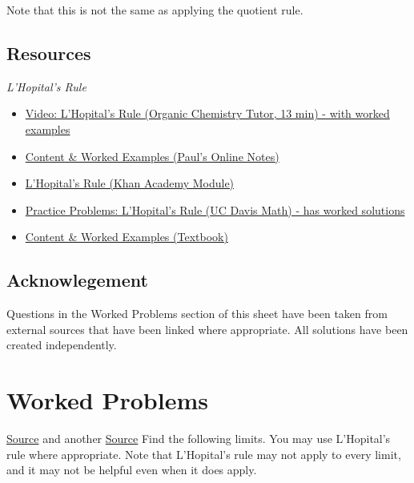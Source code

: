 \documentclass{article}
\begin{document}
\noindent Note that this is not the same as applying the quotient rule. 

\subsection*{Resources}


\noindent\textit{L'Hopital's Rule}
\begin{itemize}
    \item \href{https://youtu.be/Gh48aOvWcxw}{Video: L'Hopital's Rule (Organic Chemistry Tutor, 13 min) - with worked examples} 
    \item \href{https://tutorial.math.lamar.edu/classes/calci/lhospitalsrule.aspx}{Content \& Worked Examples (Paul's Online Notes)}
    \item \href{https://www.khanacademy.org/math/ap-calculus-ab/ab-diff-contextual-applications-new/ab-4-7/v/introduction-to-l-hopital-s-rule}{L'Hopital's Rule (Khan Academy Module)}
    \item \href{https://www.math.ucdavis.edu/~kouba/CalcOneDIRECTORY/lhopitaldirectory/LHopital.html}{Practice Problems: L'Hopital's Rule (UC Davis Math) - has worked solutions}
    \item \href{https://ic.arc.losrios.edu/~mirzaam/math400/LHOPITALRULE.pdf}{Content \& Worked Examples (Textbook)}
\end{itemize}


\subsection*{Acknowlegement}
Questions in the Worked Problems section of this sheet have been taken from external sources that have been linked where appropriate. All solutions have been created independently.

\pagebreak
\section*{Worked Problems}
\label{WorkedProblems}
\href{https://www.math.cmu.edu/~bkell/lhopital.pdf}{Source} and another \href{https://www.murrieta.k12.ca.us/cms/lib/CA01000508/Centricity/Domain/1702/LHopitals%20rule%20overview%20and%20practice.pdf}{Source}
\newline \noindent Find the following limits. You may use L'Hopital's rule where appropriate. Note that L'Hopital's rule may not apply to every limit, and it may not be helpful even when it does apply. 
\end{document}
